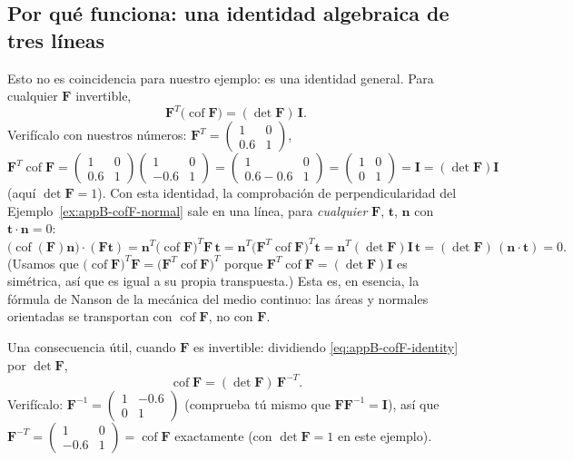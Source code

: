 \documentclass[11pt,a4paper]{article}
\newcommand{\Cof}{\operatorname{cof}}
\begin{document}
\subsection{Por qu\'e funciona: una identidad algebraica de tres l\'ineas}

Esto no es coincidencia para nuestro ejemplo: es una identidad
general. Para cualquier $\bm F$ invertible,
\begin{equation}
 \bm F^T\big(\Cof\bm F\big)=(\det\bm F)\,\bm I.
 \label{eq:appB-cofF-identity}
\end{equation}
Verif\'icalo con nuestros n\'umeros:
$\bm F^T=\begin{pmatrix}1&0\\0.6&1\end{pmatrix}$,
\[
 \bm F^T\Cof\bm F=\begin{pmatrix}1&0\\0.6&1\end{pmatrix}\begin{pmatrix}1&0\\-0.6&1\end{pmatrix}
 =\begin{pmatrix}1&0\\0.6-0.6&1\end{pmatrix}=\begin{pmatrix}1&0\\0&1\end{pmatrix}=\bm I=(\det\bm F)\bm I
\]
(aqu\'i $\det\bm F=1$). Con esta identidad, la comprobaci\'on de
perpendicularidad del Ejemplo~\ref{ex:appB-cofF-normal} sale en una
l\'inea, para \emph{cualquier} $\bm F$, $\bm t$, $\bm n$ con
$\bm t\cdot\bm n=0$:
\[
 \big(\Cof(\bm F)\bm n\big)\cdot(\bm F\bm t)
 =\bm n^T\big(\Cof\bm F\big)^T\bm F\,\bm t
 =\bm n^T\big(\bm F^T\Cof\bm F\big)^T\bm t
 =\bm n^T(\det\bm F)\bm I\,\bm t
 =(\det\bm F)\,(\bm n\cdot\bm t)=0.
\]
(Usamos que $\big(\Cof\bm F\big)^T\bm F=\big(\bm F^T\Cof\bm F\big)^T$
porque $\bm F^T\Cof\bm F=(\det\bm F)\bm I$ es sim\'etrica, as\'i que es
igual a su propia transpuesta.) Esta es, en esencia, la f\'ormula de
Nanson de la mec\'anica del medio continuo: las \'areas y normales
orientadas se transportan con $\Cof\bm F$, no con $\bm F$.

Una consecuencia \'util, cuando $\bm F$ es invertible: dividiendo
\eqref{eq:appB-cofF-identity} por $\det\bm F$,
\begin{equation}
 \Cof\bm F=(\det\bm F)\,\bm F^{-T}.
 \label{eq:appB-cofF-inverse}
\end{equation}
Verif\'icalo: $\bm F^{-1}=\begin{pmatrix}1&-0.6\\0&1\end{pmatrix}$
(comprueba t\'u mismo que $\bm F\bm F^{-1}=\bm I$), as\'i que
$\bm F^{-T}=\begin{pmatrix}1&0\\-0.6&1\end{pmatrix}=\Cof\bm F$
exactamente (con $\det\bm F=1$ en este ejemplo).
\end{document}
